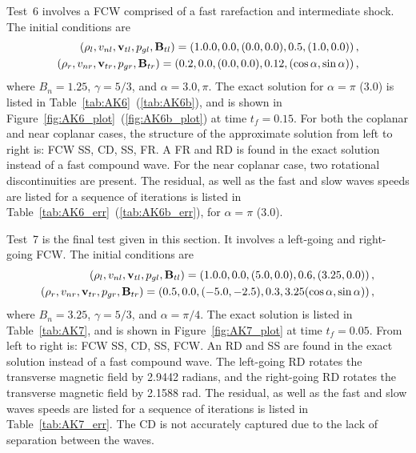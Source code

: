 Test~6 involves a FCW comprised of a fast rarefaction and intermediate shock.  The initial conditions are
\begin{gather}
\begin{split}
\label{eqn:AK6_init}
(\rho_l,v_{nl},\mathbf{v}_{tl},p_{gl},\mathbf{B}_{tl})= \left(1.0.0,0.0,(0.0,0.0),0.5,(1.0, 0.0)\right), \\
(\rho_r,v_{nr},\mathbf{v}_{tr},p_{gr},\mathbf{B}_{tr}) = \left(0.2,0.0,(0.0,0.0),0.12,(\cos \alpha,\sin \alpha)\right),
\end{split}
\end{gather}
where $B_n = 1.25$, $\gamma=5/3$, and $\alpha = 3.0, \pi$.  The exact solution for $\alpha = \pi$ ($3.0$) is listed in Table~\ref{tab:AK6}~(\ref{tab:AK6b}), and is shown in Figure~\ref{fig:AK6_plot}~(\ref{fig:AK6b_plot}) at time $t_f=0.15$.  For both the coplanar and near coplanar cases, the structure of the approximate solution from left to right is: FCW SS, CD, SS, FR.  A FR and RD is found in the exact solution instead of a fast compound wave.  For the near coplanar case, two rotational discontinuities are present.  The residual, as well as the fast and slow waves speeds are listed for a sequence of iterations is listed in Table~\ref{tab:AK6_err}~(\ref{tab:AK6b_err}), for $\alpha = \pi$ ($3.0$).  

Test~7 is the final test given in this section.  It involves a left-going and right-going FCW.  The initial conditions are
\begin{gather}
\begin{split}
\label{eqn:AK7_init}
(\rho_l,v_{nl},\mathbf{v}_{tl},p_{gl},\mathbf{B}_{tl})= \left(1.0.0,0.0,(5.0,0.0),0.6,(3.25, 0.0)\right), \\
(\rho_r,v_{nr},\mathbf{v}_{tr},p_{gr},\mathbf{B}_{tr}) = \left(0.5,0.0,(-5.0,-2.5),0.3,3.25(\cos \alpha,\sin \alpha)\right),
\end{split}
\end{gather}
where $B_n = 3.25$, $\gamma=5/3$, and $\alpha = \pi/4$.  The exact solution is listed in Table~\ref{tab:AK7}, and is shown in Figure~\ref{fig:AK7_plot} at time $t_f=0.05$.  From left to right is: FCW SS, CD, SS, FCW.  An RD and SS are found in the exact solution instead of a fast compound wave.  The left-going RD rotates the transverse magnetic field by 2.9442 radians, and the right-going RD rotates the transverse magnetic field by 2.1588 rad.  The residual, as well as the fast and slow waves speeds are listed for a sequence of iterations is listed in Table~\ref{tab:AK7_err}.  The CD is not accurately captured due to the lack of separation between the waves.

